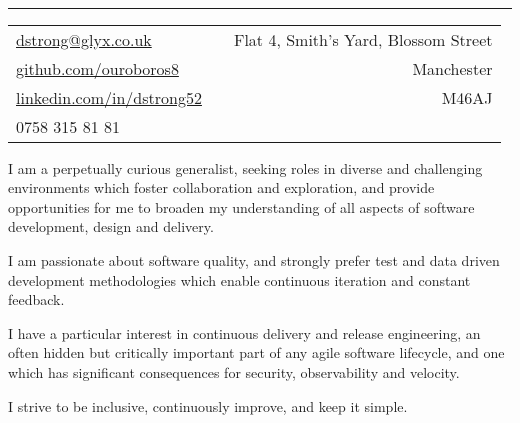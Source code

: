 \documentclass[a4paper,10pt]{article} %
\begin{document}
\pagestyle{empty} %


\\ %
\hrule
\footnotesize
{\begin{tabularx}{\textwidth}{lXr}
\href{mailto:dstrong@glyx.co.uk}{dstrong@glyx.co.uk}                    & & {Flat 4, Smith's Yard, Blossom Street}\\
\href{https://github.com/ouroboros8}{github.com/ouroboros8}             & & {Manchester}\\
\href{https://www.linkedin.com/in/dstrong52}{linkedin.com/in/dstrong52} & & {M46AJ} \\
{0758 315 81 81}                                                        & &
\end{tabularx}}

\begin{flushleft}
I am a perpetually curious generalist, seeking roles in diverse and challenging
environments which foster collaboration and exploration, and provide
opportunities for me to broaden my understanding of all aspects of software
development, design and delivery.

I am passionate about software quality, and strongly prefer test and data
driven development methodologies which enable continuous iteration and constant
feedback.

I have a particular interest in continuous delivery and release engineering, an
often hidden but critically important part of any agile software lifecycle, and
one which has significant consequences for security, observability and
velocity.

I strive to be inclusive, continuously improve, and keep it simple.
\end{flushleft}

\end{document}
